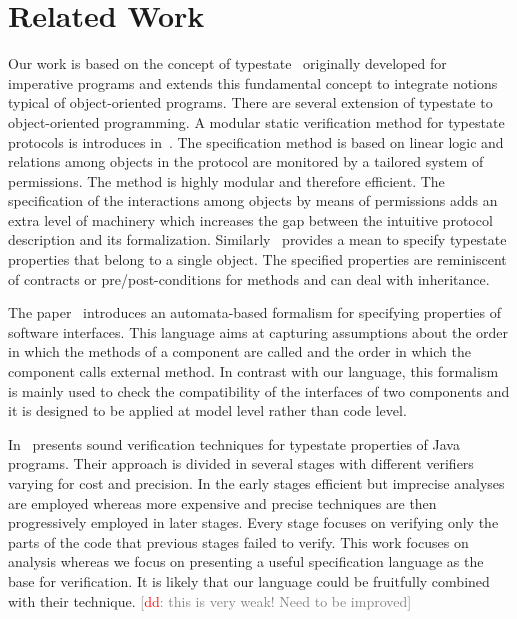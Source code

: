 \documentclass[preprint]{sigplanconf} %
\newcommand{\note}[2]{\textcolor{gray}{[\textcolor{red}{#1}: #2]}}
\newcommand{\dd}[1]{\note{dd}{#1}}
\newcommand{\dinocomment}[1]{\dd{#1}}
\theoremstyle{definition}
\theoremstyle{remark}
\begin{document}
\section{Related Work}\label{sec:related} %
Our work is based on the concept of typestate~\cite{strom1986} originally developed for imperative programs and extends this fundamental concept to integrate notions typical of object-oriented programs. 
There are several extension of typestate to object-oriented programming.
A modular static verification method for typestate protocols is introduces in~\cite{dblp:conf/oopsla/BierhoffA07}. 
The specification method is based on linear logic and relations among objects in the protocol are monitored by a tailored system of permissions. 
The method is highly modular and therefore efficient.  The specification of the interactions among objects by means of permissions adds an extra level of machinery which increases the gap between the intuitive protocol description and its formalization. Similarly~\cite{deline2004,dblp:conf/sigsoft/BierhoffA05} provides a mean to specify typestate properties that belong to a single object. The specified properties are reminiscent of contracts or pre/post-conditions for methods and
can deal with inheritance.


The paper~\cite{dblp:conf/sigsoft/AlfaroH01} introduces an automata-based formalism for specifying properties of software interfaces.
This language aims at capturing assumptions about the order in which the methods of a component are called and the order in which the component calls external method.
In contrast with our language, this formalism is mainly used to check the compatibility of the interfaces of two components and it is designed to be applied at  model level rather than code level.

In~\cite{dblp:conf/issta/FinkYDRG06} presents sound verification techniques for typestate properties of Java  programs.
Their approach is divided in several stages with different verifiers varying for cost and precision.
In the early stages efficient but imprecise analyses are employed whereas
more expensive and precise techniques are then progressively employed in later stages.
Every stage focuses on verifying only the parts of the code that previous stages failed to verify.
This work focuses on analysis whereas we focus on presenting a useful specification language as the base for verification.
It is likely that our language could be fruitfully combined with their technique.
\dinocomment{this is very weak! Need to be improved}
\end{document}
